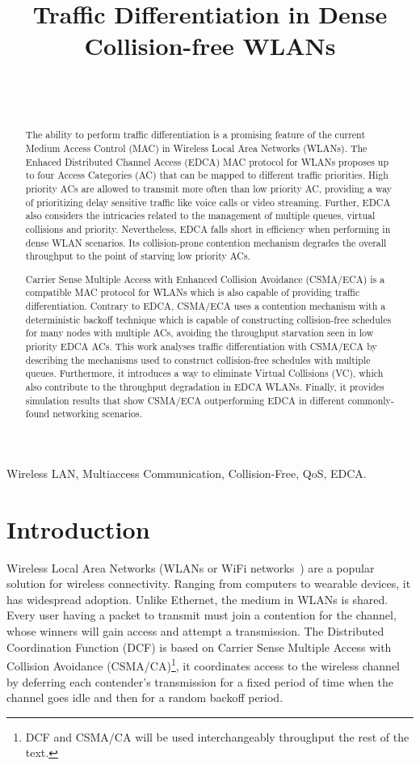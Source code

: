 \documentclass[a4paper,journal]{IEEEtran}
\title{Traffic Differentiation in Dense Collision-free WLANs}
\author{\IEEEauthorblockN{Luis Sanabria-Russo\IEEEauthorrefmark{0}, Boris Bellalta\IEEEauthorrefmark{0}}\\
      \IEEEauthorblockA{\IEEEauthorrefmark{0}Department of Information and Communication Technologies \\ Universitat Pompeu Fabra, Barcelona, Spain
      \\\ {\tt \{luis.sanabria,boris.bellalta\}@upf.edu}}\\
  }
\begin{document}
\maketitle

\begin{abstract}
The ability to perform traffic differentiation is a promising feature of the current Medium Access Control (MAC) in Wireless Local Area Networks (WLANs). The Enhaced Distributed Channel Access (EDCA) MAC protocol for WLANs proposes up to four Access Categories (AC) that can be mapped to different traffic priorities. High priority ACs are allowed to transmit more often than low priority AC, providing a way of prioritizing delay sensitive traffic like voice calls or video streaming. Further, EDCA also considers the intricacies related to the management of multiple queues, virtual collisions and priority. Nevertheless, EDCA falls short in efficiency when performing in dense WLAN scenarios. Its collision-prone contention mechanism degrades the overall throughput to the point of starving low priority ACs.

Carrier Sense Multiple Access with Enhanced Collision Avoidance (CSMA/ECA) is a compatible MAC protocol for WLANs which is also capable of providing traffic differentiation. Contrary to EDCA, CSMA/ECA uses a contention mechanism with a deterministic backoff technique which is capable of constructing collision-free schedules for many nodes with multiple ACs, avoiding the throughput starvation seen in low priority EDCA ACs. This work analyses traffic differentiation with CSMA/ECA by describing the mechanisms used to construct collision-free schedules with multiple queues. Furthermore, it introduces a way to eliminate Virtual Collisions (VC), which also contribute to the throughput degradation in EDCA WLANs. Finally, it provides simulation results that show CSMA/ECA outperforming EDCA in different commonly-found networking scenarios.
\end{abstract}

\begin{IEEEkeywords}
Wireless LAN, Multiaccess Communication, Collision-Free, QoS, EDCA.
\end{IEEEkeywords}

\section{Introduction}
Wireless Local Area Networks (WLANs or WiFi networks~\cite{802Standards}) are a popular solution for wireless connectivity. Ranging from computers to wearable devices, it has widespread adoption. Unlike Ethernet, the medium in WLANs is shared. Every user having a packet to transmit must join a contention for the channel, whose winners will gain access and attempt a transmission. The Distributed Coordination Function (DCF) is based on Carrier Sense Multiple Access with Collision Avoidance (CSMA/CA)\footnote{DCF and CSMA/CA will be used interchangeably throughput the rest of the text.}, it coordinates access to the wireless channel by deferring each contender's transmission for a fixed period of time when the channel goes idle and then for a random backoff period.
\end{document}
